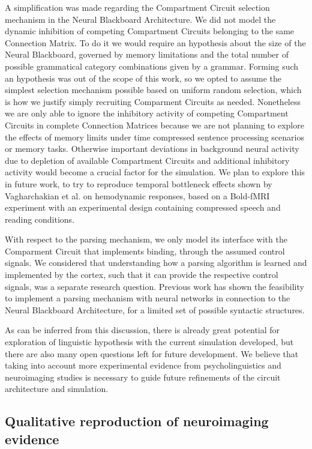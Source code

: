 \documentclass[10pt]{article}
\begin{document}
A simplification was made regarding the Compartment Circuit selection mechanism in the Neural Blackboard Architecture.
We did not model the dynamic inhibition of competing Compartment Circuits belonging to the same Connection Matrix.
To do it we would require an hypothesis about the size of the Neural Blackboard, governed by memory limitations and the total number of possible grammatical category combinations given by a grammar.
Forming such an hypothesis was out of the scope of this work, so we opted to assume the simplest selection mechanism possible based on uniform random selection, which is how we justify simply recruiting Comparment Circuits as needed.
Nonetheless we are only able to ignore the inhibitory activity of competing Compartment Circuits in complete Connection Matrices because we are not planning to explore the effects of memory limits under time compressed sentence processing scenarios or memory tasks.
Otherwise important deviations in background neural activity due to depletion of available Compartment Circuits and additional inhibitory activity would become a crucial factor for the simulation.
We plan to explore this in future work, to try to reproduce temporal bottleneck effects shown by Vagharchakian et al. on hemodynamic responses, based on a Bold-fMRI experiment with an experimental design containing compressed speech and reading conditions\cite{Vagharchakian_2012}.

With respect to the parsing mechanism, we only model its interface with the Comparment Circuit that implements binding, through the assumed control signals.
We considered that understanding how a parsing algorithm is learned and implemented by the cortex, such that it can provide the respective control signals, was a separate research question.
Previous work has shown the feasibility to implement a parsing mechanism with neural networks in connection to the Neural Blackboard Architecture\cite{van_der_Velde_2010}, for a limited set of possible syntactic structures.

As can be inferred from this discussion, there is already great potential for exploration of linguistic hypothesis with the current simulation developed, but there are also many open questions left for future development.
We believe that taking into account more experimental evidence from psycholinguistics and neuroimaging studies is necessary to guide future refinements of the circuit architecture and simulation.


\subsection{Qualitative reproduction of neuroimaging evidence}
\end{document}
